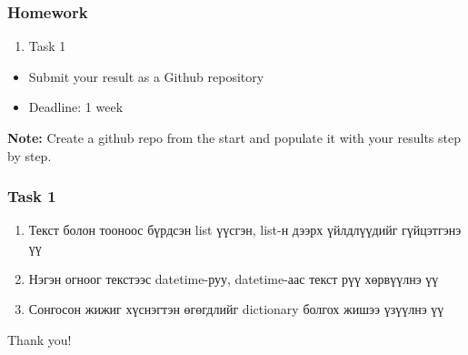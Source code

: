\documentclass{beamer}
\begin{document}
\begin{frame}
    \frametitle{Homework}
    \begin{enumerate}
        \item Task 1
    \end{enumerate}

    \vskip 2mm
    \begin{itemize}
        \item Submit your result as a Github repository
        \item Deadline: 1 week %
    \end{itemize}

\vfill
\textbf{Note:} Create a github repo from the start and populate it with your results step by step.
\end{frame}

\begin{frame}
    \frametitle{Task 1}
    \begin{enumerate}
        \item Текст болон тооноос бүрдсэн list үүсгэн, list-н дээрх үйлдлүүдийг гүйцэтгэнэ үү
        \item Нэгэн огноог текстээс datetime-руу, datetime-аас текст рүү хөрвүүлнэ үү
        \item Сонгосон жижиг хүснэгтэн өгөгдлийг dictionary болгох жишээ үзүүлнэ үү
    \end{enumerate}
\end{frame}

\begin{frame}
\Huge{\centerline{Thank you!}}
\end{frame}

\end{document}
